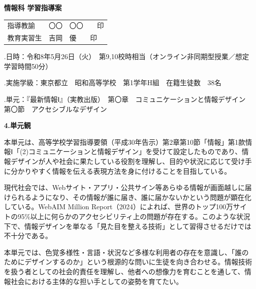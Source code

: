 \documentclass[uplatex,a4paper,11pt]{jsarticle}
\newcommand{\itemhead}[2]{\par\medskip\noindent\textbf{#1.\quad #2}\par\nopagebreak\smallskip}
\begin{document}
\begin{center}
  {\LARGE \textbf{情報科 学習指導案}}
\end{center}

\begin{flushright}
  \begin{tabular}{ll}
    指導教諭   & 〇〇　〇〇　　印 \\
    教育実習生 & 吉岡　優　　印 \\
  \end{tabular}
\end{flushright}

\bigskip

.\quad 日\hspace{1zw}時：令和8年5月26日（火）　第9,10校時相当（オンライン非同期型授業／想定学習時間50分） \par
{}.\quad 実施学級：東京都立　昭和高等学校　第1学年H組　在籍生徒数　38名 \par
{}.\quad 単\hspace{1zw}元：『最新情報Ⅰ』（実教出版）　第〇章　コミュニケーションと情報デザイン　第〇節　アクセシブルなデザイン \par


\itemhead{4}{単元観}
\hspace{1zw}本単元は、高等学校学習指導要領（平成30年告示）第2章第10節「情報」第1款情報Ⅰ「(2)コミュニケーションと情報デザイン」を受けて設定したものであり、情報デザインが人や社会に果たしている役割を理解し、目的や状況に応じて受け手に分かりやすく情報を伝える表現方法を身に付けることを目指している。\par
\hspace{1zw}現代社会では、Webサイト・アプリ・公共サイン等あらゆる情報が画面越しに届けられるようになり、その情報が誰に届き、誰に届かないかという問題が顕在化している。WebAIM Million Report（2024）によれば、世界のトップ100万サイトの95\%以上に何らかのアクセシビリティ上の問題が存在する。このような状況下で、情報デザインを単なる「見た目を整える技術」として習得させるだけでは不十分である。\par
\hspace{1zw}本単元では、色覚多様性・言語・状況など多様な利用者の存在を意識し、「誰のためにデザインするのか」という根源的な問いに生徒を向き合わせる。情報技術を扱う者としての社会的責任を理解し、他者への想像力を育むことを通して、情報社会における主体的な担い手としての姿勢を育てたい。\par
\end{document}
